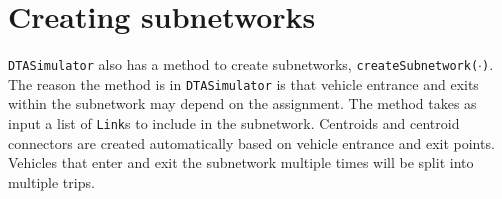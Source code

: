 \section{Creating subnetworks}

\texttt{DTASimulator} also has a method to create subnetworks, \texttt{createSubnetwork($\cdot$)}. The reason the method is in \texttt{DTASimulator} is that vehicle entrance and exits within the subnetwork may depend on the assignment. The method takes as input a list of \texttt{Link}s to include in the subnetwork. Centroids and centroid connectors are created automatically based on vehicle entrance and exit points. Vehicles that enter and exit the subnetwork multiple times will be split into multiple trips. 